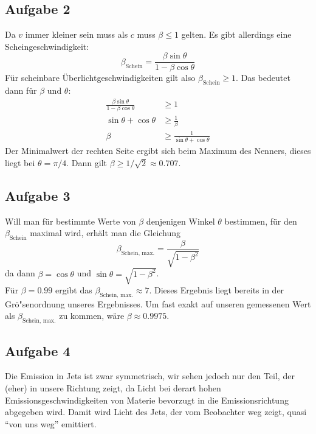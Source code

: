 \documentclass[12pt]{article}
\begin{document}
\subsection{Aufgabe 2}

Da $v$ immer kleiner sein muss als $c$ muss $\beta \leq 1$ gelten. Es gibt allerdings eine Scheingeschwindigkeit:
\begin{equation}
	\beta_{\text{Schein}} = \frac{\beta \sin \theta}{1-\beta \cos \theta}
\end{equation}
F\"{u}r scheinbare \"{U}berlichtgeschwindigkeiten gilt also $\beta_{\text{Schein}}\geq 1$. Das bedeutet dann f\"{u}r $\beta$ und $\theta$:
\begin{align*}
	\frac{\beta \sin \theta}{1-\beta \cos \theta} &\geq 1 \\
	\sin \theta + \cos \theta &\geq \frac{1}{\beta} \\
	\beta &\geq \frac{1}{\sin \theta + \cos \theta}
\end{align*}
Der Minimalwert der rechten Seite ergibt sich beim Maximum des Nenners, dieses liegt bei $\theta = \pi / 4$. Dann gilt $\beta\geq 1/\sqrt{2}\approx0.707$.

\subsection{Aufgabe 3}

Will man f\"{u}r bestimmte Werte von $\beta$ denjenigen Winkel $\theta$ bestimmen, f\"{u}r den $\beta_{\text{Schein}}$ maximal wird, erh\"{a}lt man die Gleichung
\begin{equation}
	\beta_{\text{Schein, max.}} = \frac{\beta}{\sqrt{1-\beta ^2}}
\end{equation}
da dann $\beta = \cos \theta$ und $\sin \theta = \sqrt{1-\beta ^2}$.\\
F\"{u}r $\beta = 0.99$ ergibt das $\beta_{\text{Schein, max.}} \approx 7$. Dieses Ergebnis liegt bereits in der Gr\"{o}"senordnung unseres Ergebnisses. Um fast exakt auf unseren gemessenen Wert als $\beta_{\text{Schein, max.}}$ zu kommen, w\"{a}re $\beta\approx0.9975$.

\subsection{Aufgabe 4}

Die Emission in Jets ist zwar symmetrisch, wir sehen jedoch nur den Teil, der (eher) in unsere Richtung zeigt, da Licht bei derart hohen Emissionsgeschwindigkeiten von Materie bevorzugt in die Emissionsrichtung abgegeben wird. Damit wird Licht des Jets, der vom Beobachter weg zeigt, quasi ``von uns weg'' emittiert.
\end{document}
